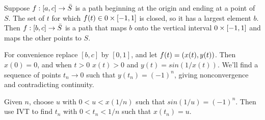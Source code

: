 \documentclass[10pt]{report}
\begin{document}
Suppose $f:\left[ a,c \right] \rightarrow \bar S$ is a path beginning at the origin and ending at a point of $S$.
The set of $t$ for which $f(t) \in 0 \times \left[ -1,1 \right]$ is closed, so it has a largest element $b$.
Then $f:\left[ b,c \right] \rightarrow \bar S$ is a path that maps $b$ onto the vertical interval $0 \times \left[ -1,1 \right]$ and maps the other points to $S$.

For convenience replace $[b,c]$ by $[0,1]$, and let $f(t) = \left( x(t),y(t) \right)$.
Then $x(0) = 0$, and when $t>0$ $x(t) > 0$ and $y(t) = sin(1/x(t))$.
We'll find a sequence of points $t_n \rightarrow 0$ such that $y(t_n) = (-1)^n$, giving nonconvergence and contradicting continuity.

Given $n$, choose $u$ with $0 < u < x(1/n)$ such that $sin(1/u) = (-1)^n$.
Then use IVT to find $t_n$ with $0 < t_n < 1/n$ such that $x(t_n) = u$.
\end{document}
